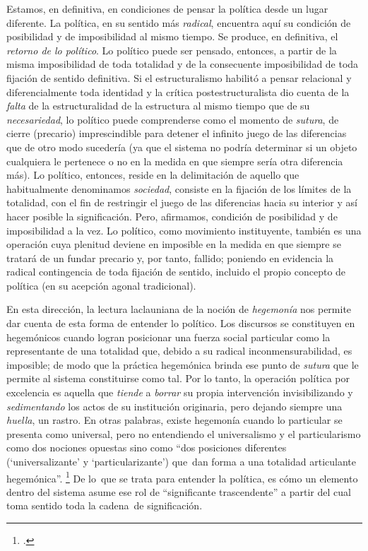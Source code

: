 Estamos, en definitiva, en condiciones de pensar la política desde un lugar diferente. La política, en su sentido más \emph{radical}, encuentra aquí su condición de posibilidad y de imposibilidad al mismo tiempo. Se produce, en definitiva, el \emph{retorno de lo político}. Lo político puede ser pensado, entonces, a partir de la misma imposibilidad de toda totalidad y de la consecuente imposibilidad de toda fijación de sentido definitiva. Si el estructuralismo habilitó a pensar relacional y diferencialmente toda identidad y la crítica postestructuralista dio cuenta de la \emph{falta} de la estructuralidad de la estructura al mismo tiempo que de su \emph{necesariedad}, lo político puede comprenderse como el momento de \emph{sutura}, de cierre (precario) imprescindible para detener el infinito juego de las diferencias que de otro modo sucedería (ya que el sistema no podría determinar si un objeto cualquiera le pertenece o no en la medida en que siempre sería otra diferencia más). Lo político, entonces, reside en la delimitación de aquello que habitualmente denominamos \emph{sociedad}, consiste en la fijación de los límites de la totalidad, con el fin de restringir el juego de las diferencias hacia su interior y así hacer posible la significación. Pero, afirmamos, condición de posibilidad y de imposibilidad a la vez. Lo político, como movimiento instituyente, también es una operación cuya plenitud deviene en imposible en la medida en que siempre se tratará de un fundar precario y, por tanto, fallido; poniendo en evidencia la radical contingencia de toda fijación de sentido, incluido el propio concepto de política (en su acepción agonal tradicional).

En esta dirección, la lectura laclauniana de la noción de \emph{hegemonía} nos permite dar cuenta de esta forma de entender lo político. Los discursos se constituyen en hegemónicos cuando logran posicionar una fuerza social particular como la representante de una totalidad que, debido a su radical inconmensurabilidad, es imposible; de modo que la práctica hegemónica brinda ese punto de \emph{sutura} que le permite al sistema constituirse como tal. Por lo tanto, la operación política por excelencia es aquella que \emph{tiende} a \emph{borrar} su propia intervención invisibilizando y \emph{sedimentando} los actos de su institución originaria, pero dejando siempre una \emph{huella}, un rastro. En otras palabras, existe hegemonía cuando lo particular se presenta como universal, pero no entendiendo el universalismo y el particularismo como dos nociones opuestas sino como \enquote{dos posiciones diferentes (\enquote{universalizante} y \enquote{particularizante}) que~dan forma a una totalidad articulante hegemónica}. \footcite[][301]{@7029-LACLAU2000} De lo~que se trata para entender la política, es cómo un elemento dentro del sistema asume ese rol de \enquote{significante trascendente}  a partir del cual toma sentido toda la cadena~de significación.


